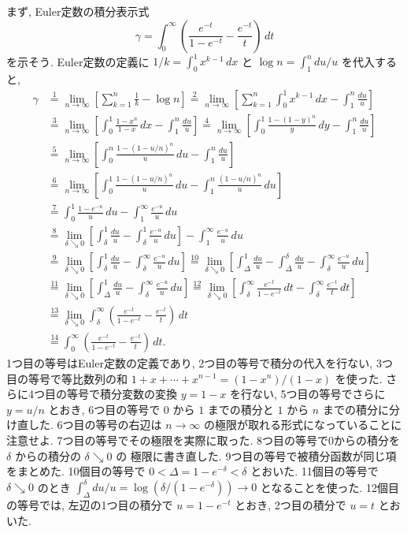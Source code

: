 \documentclass[12pt,twoside]{jarticle}
\theoremstyle{jplain}
\theoremstyle{jplain}
\theoremstyle{jplain}
\numberwithin{theorem}{section}
\numberwithin{equation}{section}
\numberwithin{figure}{section}
\numberwithin{table}{section}
\begin{document}
まず, Euler定数の積分表示式
\[
\gamma
= \int_0^\infty\left(\frac{e^{-t}}{1-e^{-t}}-\frac{e^{-t}}{t}\right)\,dt
\]
を示そう.
Euler定数の定義に $1/k=\int_0^1 x^{k-1}\,dx$
と $\log n=\int_1^n du/u$ を代入すると,
\begin{align*}
\gamma
&
\overset1=
\lim_{n\to\infty}\left[\sum_{k=1}^n \frac{1}{k} - \log n\right]
\overset2=
\lim_{n\to\infty}\left[\sum_{k=1}^n \int_0^1 x^{k-1}\,dx - \int_1^n \frac{du}{u}\right]
\\ &
\overset3=
\lim_{n\to\infty}\left[\int_0^1\frac{1-x^n}{1-x}\,dx - \int_1^n \frac{du}{u}\right]
\overset4=
\lim_{n\to\infty}\left[\int_0^1\frac{1-(1-y)^n}{y}\,dy - \int_1^n \frac{du}{u}\right]
\\ &
\overset5=
\lim_{n\to\infty}\left[\int_0^n\frac{1-(1-u/n)^n}{u}\,du - \int_1^n \frac{du}{u}\right]
\\ &
\overset6=
\lim_{n\to\infty}
\left[\int_0^1\frac{1-(1-u/n)^n}{u}\,du - \int_1^n \frac{(1-u/n)^n}{u}\,du\right]
\\ &
\overset7=
\int_0^1 \frac{1-e^{-u}}{u}\,du - \int_1^\infty \frac{e^{-u}}{u}\,du
\\ &
\overset8=
\lim_{\delta\searrow 0}\left[
\int_\delta^1 \frac{du}{u} - \int_\delta^1 \frac{e^{-u}}{u}\,du
\right] - \int_1^\infty \frac{e^{-u}}{u}\,du
\\ &
\overset9=
\lim_{\delta\searrow 0}
\left[ \int_\delta^1 \frac{du}{u} - \int_\delta^\infty \frac{e^{-u}}{u}\,du \right]
\overset{10}=
\lim_{\delta\searrow 0}
\left[
 \int_\Delta^1 \frac{du}{u}
-\int_\Delta^\delta \frac{du}{u}
-\int_\delta^\infty \frac{e^{-u}}{u}\,du
\right]
\\ &
\overset{11}=
\lim_{\delta\searrow 0}
\left[ \int_\Delta^1 \frac{du}{u} - \int_\delta^\infty \frac{e^{-u}}{u}\,du \right]
\overset{12}=
\lim_{\delta\searrow 0}
\left[
   \int_\delta^\infty \frac{e^{-t}}{1-e^{-t}}\,dt
 - \int_\delta^\infty \frac{e^{-t}}{t}\,dt
\right]
\\ &
\overset{13}=
\lim_{\delta\searrow 0}
\int_\delta^\infty
\left(
  \frac{e^{-t}}{1-e^{-t}}
 -\frac{e^{-t}}{t}
\right) \,dt
\\ &
\overset{14}=
\int_0^\infty
\left(
  \frac{e^{-t}}{1-e^{-t}}
 -\frac{e^{-t}}{t}
\right)\,dt.
\end{align*}
1つ目の等号はEuler定数の定義であり, 2つ目の等号で積分の代入を行ない,
3つ目の等号で等比数列の和 $1+x+\cdots+x^{n-1}=(1-x^n)/(1-x)$ を使った.
さらに4つ目の等号で積分変数の変換 $y=1-x$ を行ない,
5つ目の等号でさらに $y=u/n$ とおき,
6つ目の等号で $0$ から $1$ までの積分と $1$ から $n$ までの積分に分け直した.
6つ目の等号の右辺は $n\to\infty$ の極限が取れる形式になっていることに注意せよ.
7つ目の等号でその極限を実際に取った.
8つ目の等号で0からの積分を $\delta$ からの積分の $\delta\searrow 0$ の
極限に書き直した.
9つ目の等号で被積分函数が同じ項をまとめた.
10個目の等号で $0<\Delta=1-e^{-\delta}<\delta$ とおいた.
11個目の等号で $\delta\searrow 0$ のとき
$\int_\Delta^\delta du/u=\log(\delta/(1-e^{-\delta}))\to 0$ となることを使った.
12個目の等号では,
左辺の1つ目の積分で $u=1-e^{-t}$ とおき, 2つ目の積分で $u=t$ とおいた.
\end{document}
